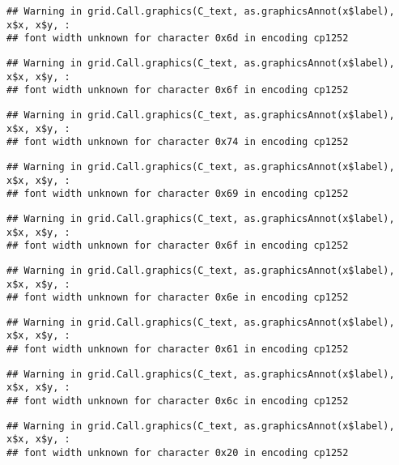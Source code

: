 \documentclass[
]{article}
\begin{document}
\begin{verbatim}
## Warning in grid.Call.graphics(C_text, as.graphicsAnnot(x$label), x$x, x$y, :
## font width unknown for character 0x6d in encoding cp1252
\end{verbatim}

\begin{verbatim}
## Warning in grid.Call.graphics(C_text, as.graphicsAnnot(x$label), x$x, x$y, :
## font width unknown for character 0x6f in encoding cp1252
\end{verbatim}

\begin{verbatim}
## Warning in grid.Call.graphics(C_text, as.graphicsAnnot(x$label), x$x, x$y, :
## font width unknown for character 0x74 in encoding cp1252
\end{verbatim}

\begin{verbatim}
## Warning in grid.Call.graphics(C_text, as.graphicsAnnot(x$label), x$x, x$y, :
## font width unknown for character 0x69 in encoding cp1252
\end{verbatim}

\begin{verbatim}
## Warning in grid.Call.graphics(C_text, as.graphicsAnnot(x$label), x$x, x$y, :
## font width unknown for character 0x6f in encoding cp1252
\end{verbatim}

\begin{verbatim}
## Warning in grid.Call.graphics(C_text, as.graphicsAnnot(x$label), x$x, x$y, :
## font width unknown for character 0x6e in encoding cp1252
\end{verbatim}

\begin{verbatim}
## Warning in grid.Call.graphics(C_text, as.graphicsAnnot(x$label), x$x, x$y, :
## font width unknown for character 0x61 in encoding cp1252
\end{verbatim}

\begin{verbatim}
## Warning in grid.Call.graphics(C_text, as.graphicsAnnot(x$label), x$x, x$y, :
## font width unknown for character 0x6c in encoding cp1252
\end{verbatim}

\begin{verbatim}
## Warning in grid.Call.graphics(C_text, as.graphicsAnnot(x$label), x$x, x$y, :
## font width unknown for character 0x20 in encoding cp1252
\end{verbatim}
\end{document}
